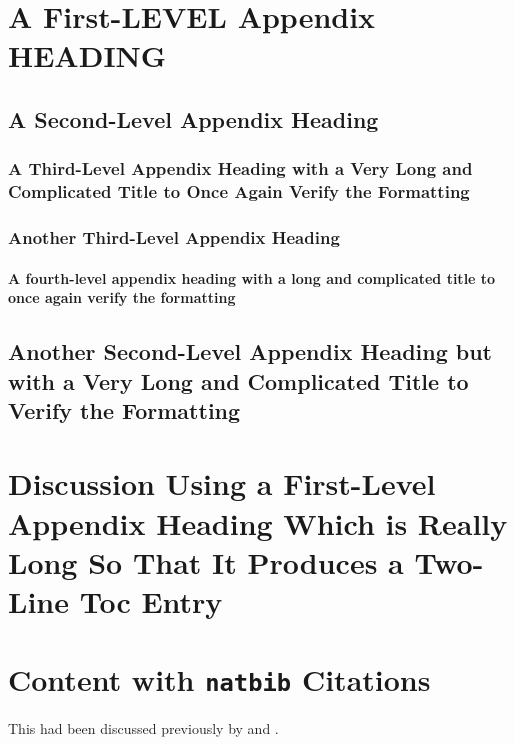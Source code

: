 


\section{A First-LEVEL Appendix HEADING}
\lipsum[7-9]

\subsection{A Second-Level Appendix Heading}
\lipsum[10]
\subsubsection{A Third-Level Appendix Heading with a Very Long and
  Complicated Title to Once Again Verify the Formatting}
\lipsum[10-12]
\subsubsection{Another Third-Level Appendix Heading}
\lipsum[10-12]
\paragraph{A fourth-level appendix heading with a long and complicated title
to once again verify the formatting}
\lipsum[13-15]

\subsection{Another Second-Level Appendix Heading but with a
Very Long and Complicated Title to Verify the Formatting}
\lipsum[13-15]

\section{Discussion Using a First-Level Appendix Heading
  Which is Really Long So That It Produces a Two-Line
  Toc Entry}
\lipsum[10-12]


\section{Content with \texttt{natbib} Citations}

This had been discussed previously by \citep{winkle.1991} and
\citet{bullwinkle.1990}. \lipsum[22-25]


\endinput
